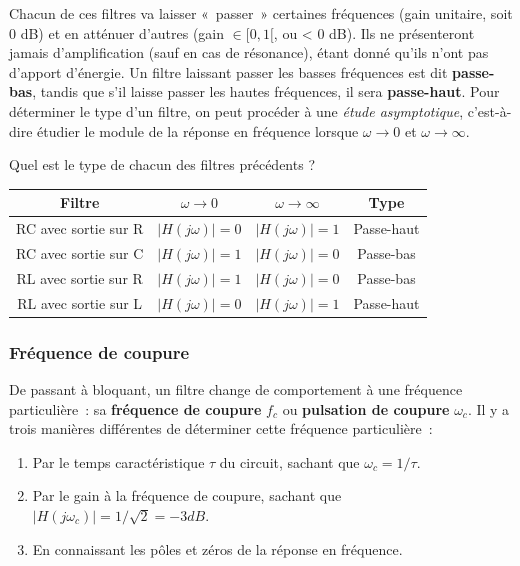 Chacun de ces filtres va laisser «~passer~» certaines fréquences (gain unitaire, soit 0 dB) et en atténuer d'autres (gain $\in [0,1[$, ou < 0 dB).
Ils ne présenteront jamais d'amplification (sauf en cas de résonance), étant donné qu'ils n'ont pas d'apport d'énergie.
Un filtre laissant passer les basses fréquences est dit \textbf{passe-bas}, tandis que s'il laisse passer les hautes fréquences, il sera \textbf{passe-haut}.
Pour déterminer le type d'un filtre, on peut procéder à une \textit{étude asymptotique}, c'est-à-dire étudier le module de la réponse en fréquence lorsque $\omega \rightarrow 0$ et $\omega \rightarrow \infty$.

{
Quel est le type de chacun des filtres précédents ?
}
{
  \begin{center}
    \begin{tabular}{cccc}
    Filtre & $\omega \rightarrow 0$ & $\omega \rightarrow \infty$ & Type \\ \hline
    RC avec sortie sur R & $|H(j\omega)| = 0$ & $|H(j\omega)| = 1$ & Passe-haut \\
    RC avec sortie sur C & $|H(j\omega)| = 1$ & $|H(j\omega)| = 0$ & Passe-bas \\
    RL avec sortie sur R & $|H(j\omega)| = 1$ & $|H(j\omega)| = 0$ & Passe-bas \\
    RL avec sortie sur L & $|H(j\omega)| = 0$ & $|H(j\omega)| = 1$ & Passe-haut \\
    \end{tabular}
  \end{center}
}

\subsubsection{Fréquence de coupure}
De passant à bloquant, un filtre change de comportement à une fréquence particulière~: sa \textbf{fréquence de coupure} $f_c$ ou \textbf{pulsation de coupure} $\omega_c$.
Il y a trois manières différentes de déterminer cette fréquence particulière~:
\begin{enumerate}
  \item Par le temps caractéristique $\tau$ du circuit, sachant que $\omega_c = 1/\tau$.
  \item Par le gain à la fréquence de coupure, sachant que $|H(j\omega_c)| = 1/\sqrt{2} = -3 dB$.
  \item En connaissant les pôles et zéros de la réponse en fréquence.
\end{enumerate}
~\\

